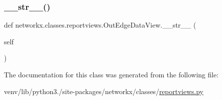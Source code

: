 \subsubsection{\texorpdfstring{\+\_\+\+\_\+str\+\_\+\+\_\+()}{\_\_str\_\_()}}
{\footnotesize\ttfamily def networkx.\+classes.\+reportviews.\+Out\+Edge\+Data\+View.\+\_\+\+\_\+str\+\_\+\+\_\+ (\begin{DoxyParamCaption}\item[{}]{self }\end{DoxyParamCaption})}



The documentation for this class was generated from the following file\+:\begin{DoxyCompactItemize}
\item 
venv/lib/python3./site-\/packages/networkx/classes/\hyperlink{reportviews_8py}{reportviews.\+py}\end{DoxyCompactItemize}
